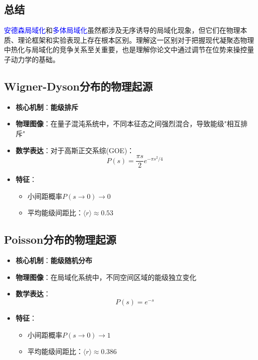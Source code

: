 \documentclass[11pt,a4paper]{article}
\begin{document}
\subsection{总结}

\textcolor{blue}{安德森局域化}和\textcolor{blue}{多体局域化}虽然都涉及无序诱导的局域化现象，但它们在物理本质、理论框架和实验表现上存在根本区别。理解这一区别对于把握现代凝聚态物理中热化与局域化的竞争关系至关重要，也是理解你论文中通过调节在位势来操控量子动力学的基础。

\subsection{Wigner-Dyson分布的物理起源}
\begin{itemize}
    \item \textbf{核心机制}：\textbf{能级排斥}
    \item \textbf{物理图像}：在量子混沌系统中，不同本征态之间强烈混合，导致能级"相互排斥"
    \item \textbf{数学表达}：对于高斯正交系综(GOE)：
    \[
    P(s) = \frac{\pi s}{2} e^{-\pi s^2/4}
    \]
    \item \textbf{特征}：
    \begin{itemize}
        \item 小间距概率$P(s \rightarrow 0) \rightarrow 0$
        \item 平均能级间距比：$\langle r \rangle \approx 0.53$
    \end{itemize}
\end{itemize}


\subsection{Poisson分布的物理起源}
\begin{itemize}
    \item \textbf{核心机制}：\textbf{能级随机分布}
    \item \textbf{物理图像}：在局域化系统中，不同空间区域的能级独立变化
    \item \textbf{数学表达}：
    \[
    P(s) = e^{-s}
    \]
    \item \textbf{特征}：
    \begin{itemize}
        \item 小间距概率$P(s \rightarrow 0) \rightarrow 1$
        \item 平均能级间距比：$\langle r \rangle \approx 0.386$
    \end{itemize}
\end{itemize}
\end{document}

